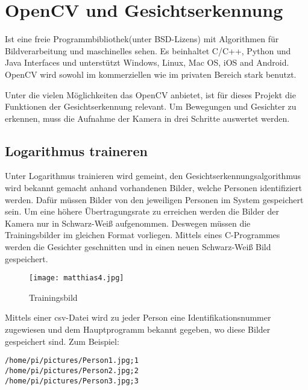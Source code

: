 \section{OpenCV und Gesichtserkennung}

Ist eine freie Programmbibliothek(unter BSD-Lizens) mit Algorithmen für Bildverarbeitung und maschinelles sehen. Es beinhaltet C/C++, Python und Java Interfaces und unterstützt Windows, Linux, Mac OS, iOS and Android. OpenCV wird sowohl im kommerziellen wie im privaten Bereich stark benutzt.\cite{bib.opencv} %

Unter die vielen Möglichkeiten das OpenCV anbietet, ist für dieses Projekt die Funktionen der Gesichtserkennung relevant. Um Bewegungen und Gesichter zu erkennen, muss die Aufnahme der Kamera in drei Schritte auswertet werden. 


\subsection{Logarithmus traineren}
Unter Logarithmus trainieren wird gemeint, den Gesichtserkennungsalgorithmus wird bekannt gemacht anhand vorhandenen Bilder, welche Personen identifiziert werden. Dafür müssen Bilder von den jeweiligen Personen im System gespeichert sein. Um eine höhere Übertragungsrate zu erreichen werden die Bilder der Kamera nur in Schwarz-Weiß aufgenommen. Deswegen müssen die Trainingsbilder im gleichen Format vorliegen. Mittels eines C-Programmes werden die Gesichter geschnitten und in einen neuen Schwarz-Weiß Bild gespeichert.\\

\begin{figure}[h]
  \begin{center}		%
    \texttt{[image: matthias4.jpg]}
  		  \caption{Trainingsbild}
     \label{Trainingsbild}
  \end{center}
\end{figure}

\newpage
Mittels einer csv-Datei wird zu jeder Person eine Identifikationsnummer zugewiesen und dem Hauptprogramm bekannt gegeben, wo diese Bilder gespeichert sind. Zum Beispiel:\\

\begin{lstlisting}
/home/pi/pictures/Person1.jpg;1
/home/pi/pictures/Person2.jpg;2
/home/pi/pictures/Person3.jpg;3
\end{lstlisting}


